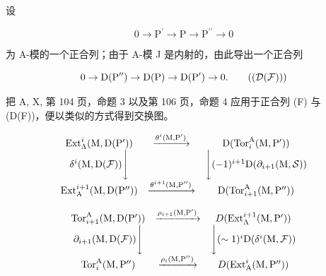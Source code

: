 设

\[
0 \to \mathrm{P} ^ {\prime} \to \mathrm{P} \to \mathrm{P} ^ {\prime \prime} \to 0\tag{F}
\]

为 A-模的一个正合列；由于 A-模 J 是内射的，由此导出一个正合列

\[
0 \to \mathrm{D} (\mathrm{P} ^ {\prime \prime}) \to \mathrm{D} (\mathrm{P}) \to \mathrm{D} (\mathrm{P} ^ {\prime}) \to 0.\tag{\(\left(\mathcal{D}(\mathcal{F})\right)\)}
\]

把 A, X, 第 104 页，命题 3 以及第 106 页，命题 4 应用于正合列 (F) 与 (D(F))，便以类似的方式得到交换图。

\[
\begin{array}{c c c} \operatorname{Ext} _ {\Lambda} ^ {i} (\mathrm{M}, \mathrm{D} (\mathrm{P} ^ {\prime})) & \xrightarrow {\theta^ {i} (\mathrm{M} , \mathrm{P} ^ {\prime})} & \mathrm{D} (\operatorname{Tor} _ {i} ^ {\mathrm{A}} (\mathrm{M}, \mathrm{P} ^ {\prime})) \\ \delta^ {i} (\mathrm{M}, \mathrm{D} (\mathcal {F})) \Bigg \downarrow & & \Bigg \downarrow (- 1) ^ {i + 1} \mathrm{D} (\partial_ {i + 1} (\mathrm{M}, \mathcal {S})) \\ \operatorname{Ext} _ {\mathrm{A}} ^ {i + 1} (\mathrm{M}, \mathrm{D} (\mathrm{P} ^ {\prime \prime})) & \xrightarrow {\theta^ {i + 1} (\mathrm{M} , \mathrm{P} ^ {\prime \prime})} & \mathrm{D} (\operatorname{Tor} _ {i + 1} ^ {\mathrm{A}} (\mathrm{M}, \mathrm{P} ^ {\prime \prime})) \end{array}
\]

\[
\begin{array}{c c c} \operatorname{Tor} _ {i + 1} ^ {\mathrm{A}} (\mathrm{M}, \mathrm{D} (\mathrm{P} ^ {\prime})) & \xrightarrow {\rho_ {i + 1} (\mathrm{M} , \mathrm{P} ^ {\prime})} & D (\operatorname{Ext} _ {\Lambda} ^ {i + 1} (\mathrm{M}, \mathrm{P} ^ {\prime})) \\ \partial_ {i + 1} (\mathrm{M}, \mathrm{D} (\mathcal {F})) \Bigg \downarrow & & \Bigg \downarrow (\sim 1) ^ {i} \mathrm{D} (\delta^ {i} (\mathrm{M}, \mathcal {F})) \\ \operatorname{Tor} _ {i} ^ {\mathrm{A}} (\mathrm{M}, \mathrm{P} ^ {\prime \prime}) & \xrightarrow {\rho_ {i} (\mathrm{M} , \mathrm{P} ^ {\prime \prime})} & D (\operatorname{Ext} _ {\mathrm{A}} ^ {i} (\mathrm{M}, \mathrm{P} ^ {\prime \prime})) \end{array}
\]


